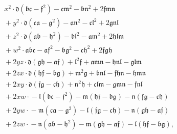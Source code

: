 \documentclass[11pt,a4paper]{article}
\begin{document}
\begin{align*}
& x^{2} \!\cdot\! \mathfrak{d} (\mathfrak{b}\mathfrak{c} - \mathfrak{f}^{2})
  - \mathfrak{c}\mathfrak{m}^{2} - \mathfrak{b}\mathfrak{n}^{2}
  + 2 \mathfrak{f}\mathfrak{m}\mathfrak{n} \\
&{}+ y^{2} \!\cdot\! \mathfrak{d} (\mathfrak{c}\mathfrak{a} - \mathfrak{g}^{2})
  - \mathfrak{a}\mathfrak{n}^{2} - \mathfrak{c}\mathfrak{l}^{2}
  + 2 \mathfrak{g}\mathfrak{n}\mathfrak{l} \\
&{}+ z^{2} \!\cdot\! \mathfrak{d} (\mathfrak{a}\mathfrak{b} - \mathfrak{h}^{2})
  - \mathfrak{b}\mathfrak{l}^{2} - \mathfrak{a}\mathfrak{m}^{2}
  + 2 \mathfrak{h}\mathfrak{l}\mathfrak{m} \\
&{}+ w^{2} \!\cdot\! \mathfrak{a}\mathfrak{b}\mathfrak{c}
  - \mathfrak{a}\mathfrak{f}^{2} - \mathfrak{b}\mathfrak{g}^{2}
  - \mathfrak{c}\mathfrak{h}^{2}
  + 2 \mathfrak{f}\mathfrak{g}\mathfrak{h} \\
&{}+ 2 y z \!\cdot\! \mathfrak{d} (\mathfrak{g}\mathfrak{h} - \mathfrak{a}\mathfrak{f})
  + \mathfrak{l}^{2} \mathfrak{f} + \mathfrak{a}\mathfrak{m}\mathfrak{n}
  - \mathfrak{h}\mathfrak{n}\mathfrak{l} - \mathfrak{g}\mathfrak{l}\mathfrak{m} \\
&{}+ 2 z x \!\cdot\! \mathfrak{d} (\mathfrak{h}\mathfrak{f} - \mathfrak{b}\mathfrak{g})
  + \mathfrak{m}^{2} \mathfrak{g} + \mathfrak{b}\mathfrak{n}\mathfrak{l}
  - \mathfrak{f}\mathfrak{h}\mathfrak{n} - \mathfrak{h}\mathfrak{m}\mathfrak{n} \\
&{}+ 2 x y \!\cdot\! \mathfrak{d} (\mathfrak{f}\mathfrak{g} - \mathfrak{c}\mathfrak{h})
  + \mathfrak{n}^{2} \mathfrak{h} + \mathfrak{c}\mathfrak{l}\mathfrak{m}
  - \mathfrak{g}\mathfrak{m}\mathfrak{n} - \mathfrak{f}\mathfrak{n}\mathfrak{l} \\
&{}+ 2 x w \!\cdot\! -\mathfrak{l} (\mathfrak{b}\mathfrak{c} - \mathfrak{f}^{2})
  - \mathfrak{m} (\mathfrak{h}\mathfrak{f} - \mathfrak{b}\mathfrak{g})
  - \mathfrak{n} (\mathfrak{f}\mathfrak{g} - \mathfrak{c}\mathfrak{h}) \\
&{}+ 2 y w \!\cdot\! -\mathfrak{m} (\mathfrak{c}\mathfrak{a} - \mathfrak{g}^{2})
  - \mathfrak{l} (\mathfrak{f}\mathfrak{g} - \mathfrak{c}\mathfrak{h})
  - \mathfrak{n} (\mathfrak{g}\mathfrak{h} - \mathfrak{a}\mathfrak{f}) \\
&{}+ 2 z w \!\cdot\! -\mathfrak{n} (\mathfrak{a}\mathfrak{b} - \mathfrak{h}^{2})
  - \mathfrak{m} (\mathfrak{g}\mathfrak{h} - \mathfrak{a}\mathfrak{f})
  - \mathfrak{l} (\mathfrak{h}\mathfrak{f} - \mathfrak{b}\mathfrak{g}),
\end{align*}
\end{document}
